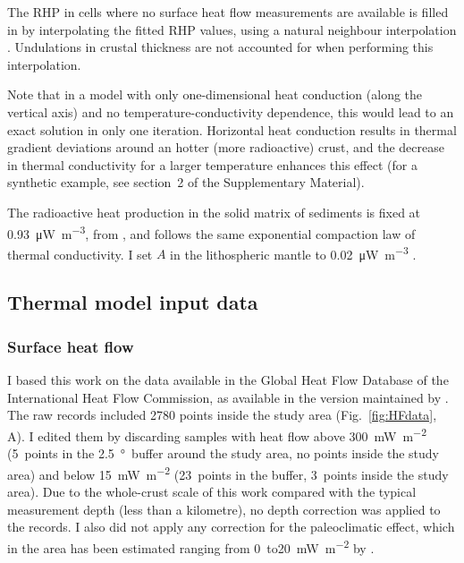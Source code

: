 The RHP in cells where no surface heat flow measurements are available is filled in by interpolating the fitted RHP values, using a natural neighbour interpolation \parencite{Sibson1981}.
Undulations in crustal thickness are not accounted for when performing this interpolation.

Note that in a model with only one-dimensional heat conduction (along the vertical axis) and no temperature-conductivity dependence, this would lead to an exact solution in only one iteration.
Horizontal heat conduction results in thermal gradient deviations around an hotter (more radioactive) crust, and the decrease in thermal conductivity for a larger temperature enhances this effect (for a synthetic example, see section~2 of the Supplementary Material).

The radioactive heat production in the solid matrix of sediments is fixed at \SI{0.93}{\micro \watt \per \cubic \metre}, from \textcite{Vila2010}, and follows the same exponential compaction law of thermal conductivity.
I set $A$ in the lithospheric mantle to \SI{0.02}{\micro \watt \per \cubic \metre} \parencite{Hasterok2011cont}.

\subsection{Thermal model input data}
\label{ss:Appl:ThermInput}

\subsubsection{Surface heat flow}
\label{sss:Appl:ThermInputSHF}

I based this work on the data available in the Global Heat Flow Database of the International Heat Flow Commission, as available in the version maintained by \textcite{globalHF}.
The raw records included 2780 points inside the study area (Fig.~\ref{fig:HFdata}, A).
I edited them by discarding samples with heat flow above 300~\si{\milli \watt \per \square \metre} (5~points in the \SI{2.5}{\degree}~buffer around the study area, no points inside the study area) and below 15~\si{\milli \watt \per \square \metre} (23~points in the buffer, 3~points inside the study area).
Due to the whole-crust scale of this work compared with the typical measurement depth (less than a kilometre), no depth correction was applied to the records.
I also did not apply any correction for the paleoclimatic effect, which in the area has been estimated ranging from \num{0}~to\SI{20}{\milli \watt \per \square \metre} by \textcite{Majorowicz2011}.

